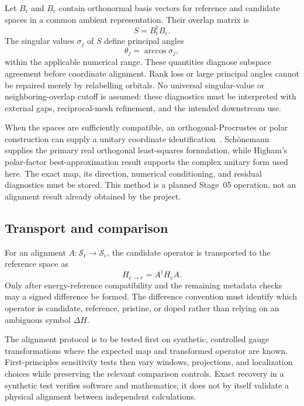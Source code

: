 Let $B_{\mathrm r}$ and $B_{\mathrm c}$ contain orthonormal basis vectors for
reference and candidate spaces in a common ambient representation. Their
overlap matrix is
\begin{equation}
  S=B_{\mathrm r}^{\dagger}B_{\mathrm c}.
\end{equation}
The singular values $\sigma_j$ of $S$ define principal
angles~\cite{bjork1973}
\begin{equation}
  \theta_j=\arccos\sigma_j,
\end{equation}
within the applicable numerical range. These quantities diagnose subspace
agreement before coordinate alignment. Rank loss or large principal angles
cannot be repaired merely by relabelling orbitals. No universal singular-value
or neighboring-overlap cutoff is assumed: these diagnostics must be interpreted
with external gaps, reciprocal-mesh refinement, and the intended downstream
use.

When the spaces are sufficiently compatible, an orthogonal-Procrustes or polar
construction can supply a unitary coordinate
identification~\cite{schonemann1966,higham1986}. Sch\"onemann supplies the
primary real orthogonal least-squares formulation, while Higham's polar-factor
best-approximation result supports the complex unitary form used here. The exact
map, its direction, numerical conditioning, and residual diagnostics must be
stored. This method is a planned Stage~05 operation, not an alignment result
already obtained by the project.

\subsection{Transport and comparison}


For an alignment $A:\mathcal S_{\mathrm r}\rightarrow\mathcal S_{\mathrm c}$,
the candidate operator is transported to the reference space as
\begin{equation}
  H_{\mathrm c\rightarrow r}=A^{\dagger}H_{\mathrm c}A.
\end{equation}
Only after energy-reference compatibility and the remaining metadata checks may
a signed difference be formed. The difference convention must identify which
operator is candidate, reference, pristine, or doped rather than relying on an
ambiguous symbol $\Delta H$.

The alignment protocol is to be tested first on synthetic, controlled gauge
transformations where the expected map and transformed operator are known.
First-principles sensitivity tests then vary windows, projections, and
localization choices while preserving the relevant comparison controls. Exact
recovery in a synthetic test verifies software and mathematics; it does not by
itself validate a physical alignment between independent calculations.

